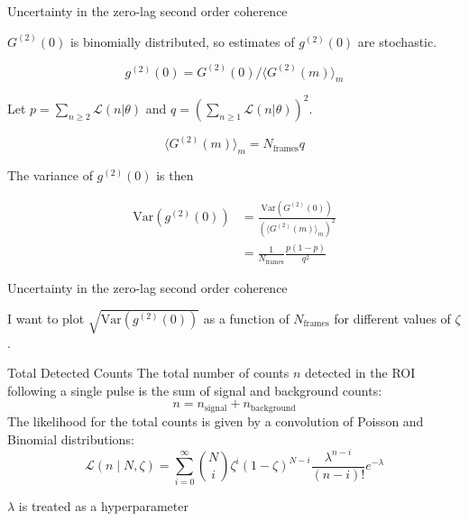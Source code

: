 \documentclass{beamer}					%
\begin{document}
\begin{frame}{Uncertainty in the zero-lag second order coherence}

$G^{(2)}(0)$ is binomially distributed, so estimates of $g^{(2)}(0)$ are stochastic.

\begin{equation*}
g^{(2)}(0) = G^{(2)}(0)/\langle G^{(2)}(m)\rangle_{m}
\end{equation*}

Let $p = \sum_{n\geq 2}\mathcal{L}(n\lvert \theta)$ and $q = (\sum_{n\geq 1}\mathcal{L}(n\lvert \theta))^{2}$. 

\begin{equation*}
\langle G^{(2)}(m)\rangle_{m} = N_{\mathrm{frames}}q
\end{equation*}

The variance of $g^{(2)}(0)$ is then

\begin{align*}
\mathrm{Var}(g^{(2)}(0)) &= \frac{\mathrm{Var}(G^{(2)}(0))}{(\langle G^{(2)}(m)\rangle_{m})^{2}}\\
&= \frac{1}{N_{\mathrm{frames}}}\frac{p(1-p)}{q^2}
\end{align*}


\end{frame}

\begin{frame}{Uncertainty in the zero-lag second order coherence}

I want to plot $\sqrt{\mathrm{Var}(g^{(2)}(0))}$ as a function of $N_{\mathrm{frames}}$ for different values of $\zeta$. 

\end{frame}


\begin{frame}{Total Detected Counts}
The total number of counts $n$ detected in the ROI following a single pulse is the sum of signal and background counts:
\begin{equation*}
n = n_{\mathrm{signal}} + n_{\mathrm{background}}
\end{equation*}
The likelihood for the total counts is given by a convolution of Poisson and Binomial distributions:
\begin{equation*}
\mathcal{L}(n \mid N, \zeta) = \sum_{i=0}^{\infty} \binom{N}{i} \zeta^i (1-\zeta)^{N-i} \frac{\lambda^{n-i}}{(n-i)!} e^{-\lambda}
\end{equation*}

$\lambda$ is treated as a hyperparameter
\end{frame}
\end{document}
